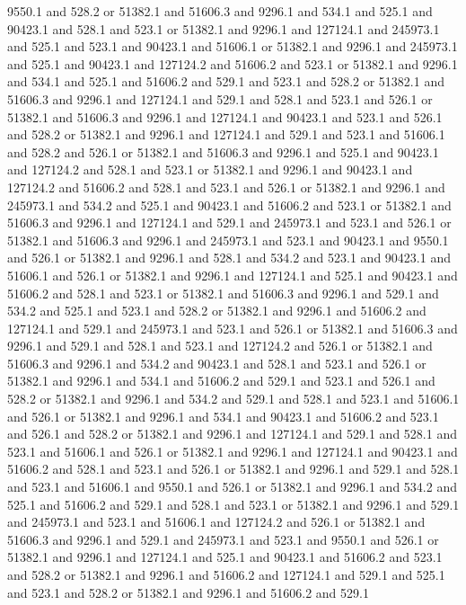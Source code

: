9550.1 and 528.2 or 51382.1 and 51606.3 and 9296.1 and 534.1 and 525.1
and 90423.1 and 528.1 and 523.1 or 51382.1 and 9296.1 and 127124.1 and
245973.1 and 525.1 and 523.1 and 90423.1 and 51606.1 or 51382.1 and
9296.1 and 245973.1 and 525.1 and 90423.1 and 127124.2 and 51606.2 and
523.1 or 51382.1 and 9296.1 and 534.1 and 525.1 and 51606.2 and 529.1
and 523.1 and 528.2 or 51382.1 and 51606.3 and 9296.1 and 127124.1 and
529.1 and 528.1 and 523.1 and 526.1 or 51382.1 and 51606.3 and 9296.1
and 127124.1 and 90423.1 and 523.1 and 526.1 and 528.2 or 51382.1 and
9296.1 and 127124.1 and 529.1 and 523.1 and 51606.1 and 528.2 and
526.1 or 51382.1 and 51606.3 and 9296.1 and 525.1 and 90423.1 and
127124.2 and 528.1 and 523.1 or 51382.1 and 9296.1 and 90423.1 and
127124.2 and 51606.2 and 528.1 and 523.1 and 526.1 or 51382.1 and
9296.1 and 245973.1 and 534.2 and 525.1 and 90423.1 and 51606.2 and
523.1 or 51382.1 and 51606.3 and 9296.1 and 127124.1 and 529.1 and
245973.1 and 523.1 and 526.1 or 51382.1 and 51606.3 and 9296.1 and
245973.1 and 523.1 and 90423.1 and 9550.1 and 526.1 or 51382.1 and
9296.1 and 528.1 and 534.2 and 523.1 and 90423.1 and 51606.1 and 526.1
or 51382.1 and 9296.1 and 127124.1 and 525.1 and 90423.1 and 51606.2
and 528.1 and 523.1 or 51382.1 and 51606.3 and 9296.1 and 529.1 and
534.2 and 525.1 and 523.1 and 528.2 or 51382.1 and 9296.1 and 51606.2
and 127124.1 and 529.1 and 245973.1 and 523.1 and 526.1 or 51382.1 and
51606.3 and 9296.1 and 529.1 and 528.1 and 523.1 and 127124.2 and
526.1 or 51382.1 and 51606.3 and 9296.1 and 534.2 and 90423.1 and
528.1 and 523.1 and 526.1 or 51382.1 and 9296.1 and 534.1 and 51606.2
and 529.1 and 523.1 and 526.1 and 528.2 or 51382.1 and 9296.1 and
534.2 and 529.1 and 528.1 and 523.1 and 51606.1 and 526.1 or 51382.1
and 9296.1 and 534.1 and 90423.1 and 51606.2 and 523.1 and 526.1 and
528.2 or 51382.1 and 9296.1 and 127124.1 and 529.1 and 528.1 and 523.1
and 51606.1 and 526.1 or 51382.1 and 9296.1 and 127124.1 and 90423.1
and 51606.2 and 528.1 and 523.1 and 526.1 or 51382.1 and 9296.1 and
529.1 and 528.1 and 523.1 and 51606.1 and 9550.1 and 526.1 or 51382.1
and 9296.1 and 534.2 and 525.1 and 51606.2 and 529.1 and 528.1 and
523.1 or 51382.1 and 9296.1 and 529.1 and 245973.1 and 523.1 and
51606.1 and 127124.2 and 526.1 or 51382.1 and 51606.3 and 9296.1 and
529.1 and 245973.1 and 523.1 and 9550.1 and 526.1 or 51382.1 and
9296.1 and 127124.1 and 525.1 and 90423.1 and 51606.2 and 523.1 and
528.2 or 51382.1 and 9296.1 and 51606.2 and 127124.1 and 529.1 and
525.1 and 523.1 and 528.2 or 51382.1 and 9296.1 and 51606.2 and 529.1
